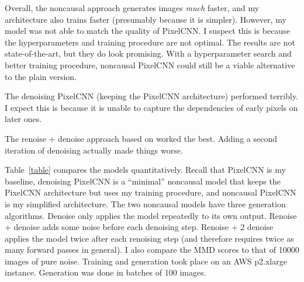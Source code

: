 \documentclass[11pt, a4paper, openany]{book}
\newcommand{\nquote}[1]{``{#1}''}
\begin{document}
Overall, the noncausal approach generates images \emph{much} faster, and my architecture also trains faster (presumably because it is simpler). However, my model was not able to match the quality of PixelCNN. I suspect this is because the hyperparameters and training procedure are not optimal. The results are not state-of-the-art, but they do look promising. With a hyperparameter search and better training procedure, noncausal PixelCNN could still be a viable alternative to the plain version.

The denoising PixelCNN (keeping the PixelCNN architecture) performed terribly. I expect this is because it is unable to capture the dependencies of early pixels on later ones.

The renoise + denoise approach based on \citet{gsnnade} worked the best. Adding a second iteration of denoising actually made things worse.

Table~\ref{table} compares the models quantitatively. Recall that PixelCNN is my baseline, denoising PixelCNN is a \nquote{minimal} noncausal model that keeps the PixelCNN architecture but uses my training procedure, and noncausal PixelCNN is my simplified architecture. The two noncausal models have three generation algorithms. Denoise only applies the model repeatedly to its own output. Renoise + denoise adds some noise before each denoising step. Renoise + 2 denoise applies the model twice after each renoising step (and therefore requires twice as many forward passes in general). I also compare the MMD scores to that of 10000 images of pure noise. Training and generation took place on an AWS p2.xlarge instance. Generation was done in batches of 100 images.
\end{document}
